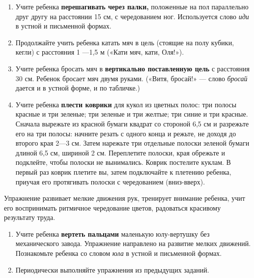\documentclass{book}
\renewcommand{\emph}[1]{\textit{#1}}
\begin{document}
\begin{enumerate}
\def\labelenumi{\arabic{enumi}.}
\setcounter{enumi}{1}
\item
  
  Учите ребенка \textbf{перешагивать через палки,} положенные на пол
  параллельно друг другу на расстоянии 15 см, с чередованием ног.
  Используется слово \emph{иди} в устной и письменной формах.
  
\item
  
  Продолжайте учить ребенка катать мяч в цель (стоящие на полу кубики,
  кегли) с расстояния 1 ---1,5 м («Кати мяч, кати, Оля!»).
  
\item
  
  Учите ребенка бросать мяч в \textbf{вертикально поставленную цель} с
  расстояния 30 см. Ребенок бросает мяч двумя руками. («Витя, бросай!»
  --- слово \emph{бросай} дается и в устной форме, и по табличке.)
  
\item
  
  Учите ребенка \textbf{плести коврики} для кукол из цветных полос: три
  полосы красные и три зеленые; три зеленые и три желтые; три синие и
  три красные. Сначала вырежьте из красной бумаги квадрат со стороной
  6,5 см и разрежьте его на три полосы: начните резать с одного конца и
  режьте, не доходя до второго края 2---3 см. Затем нарежьте три
  отдельные полоски зеленой бумаги длиной 6,5 см, шириной 2 см.
  Переплетите полоски, края обрежьте и подклейте, чтобы полоски не
  вынимались. Коврик постелите куклам. В первый раз коврик плетите вы,
  затем подключайте к плетению ребенка, приучая его протягивать полоски
  с чередованием (вниз-вверх).
  
\end{enumerate}


Упражнение развивает мелкие движения рук, тренирует внимание ребенка,
учит его воспринимать ритмичное чередование цветов, радоваться красивому
результату труда.


\begin{enumerate}
\def\labelenumi{\arabic{enumi}.}
\setcounter{enumi}{5}
\item
  
  Учите ребенка \textbf{вертеть пальцами} маленькую юлу-вертушку без
  механического завода. Упражнение направлено на развитие мелких
  движений. Познакомьте ребенка со словом \emph{юла} в устной и
  письменной формах.
  
\item
  
  Периодически выполняйте упражнения из предыдущих заданий.
  
\end{enumerate}
\end{document}
